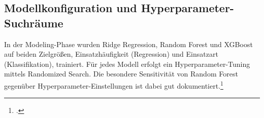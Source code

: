 \documentclass[12pt,a4paper]{article}
\begin{document}
\subsection{Modellkonfiguration und Hyperparameter-Suchräume}


In der Modeling-Phase wurden Ridge Regression, Random Forest und XGBoost auf beiden Zielgrößen,
Einsatzhäufigkeit (Regression) und Einsatzart (Klassifikation), trainiert. Für jedes Modell erfolgt
ein Hyperparameter-Tuning mittels Randomized Search. Die besondere Sensitivität von Random Forest
gegenüber Hyperparameter-Einstellungen ist dabei gut dokumentiert.\footcite[166]{Probst2019}

\end{document}

